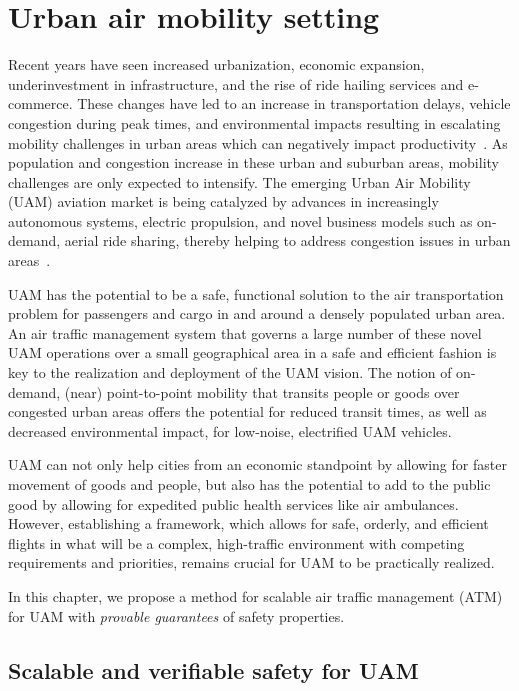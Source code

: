 
\section{Urban air mobility setting}
Recent years have seen increased urbanization, economic expansion, underinvestment in infrastructure, and the rise of ride hailing services and e-commerce.  These changes have led to an increase in transportation delays, vehicle congestion during peak times, and environmental impacts resulting in escalating mobility challenges in urban areas which can negatively impact productivity~\cite{harriet2013assessment}. As population and congestion increase in these urban and suburban areas, mobility challenges are only expected to intensify. The emerging Urban Air Mobility (UAM) aviation market is being catalyzed by advances in increasingly autonomous systems, electric propulsion, and novel business models such as on-demand, aerial ride sharing, thereby helping to address congestion issues in urban areas~\cite{flightplan2030}.  

UAM has the potential to be a safe, functional solution to the air transportation problem for passengers and cargo in and around a densely populated urban area.  An air traffic management system that governs a large number of these novel UAM operations over a small geographical area in a safe and efficient fashion is key to the realization and deployment of the UAM vision.  The notion of on-demand, (near) point-to-point mobility that transits people or goods over congested urban areas offers the potential for reduced transit times, as well as decreased environmental impact, for low-noise, electrified UAM vehicles.  

UAM can not only help cities from an economic standpoint by allowing for faster movement of goods and people, but also has the potential to add to the public good by allowing for expedited public health services like air ambulances. However, establishing a framework, which allows for safe, orderly, and efficient flights in what will be a complex, high-traffic environment with competing requirements and priorities, remains crucial for UAM to be practically realized. 

In this chapter, we propose a method for scalable air traffic management (ATM) for UAM with \emph{provable guarantees} of safety properties. 


\subsection{Scalable and verifiable safety for UAM}

